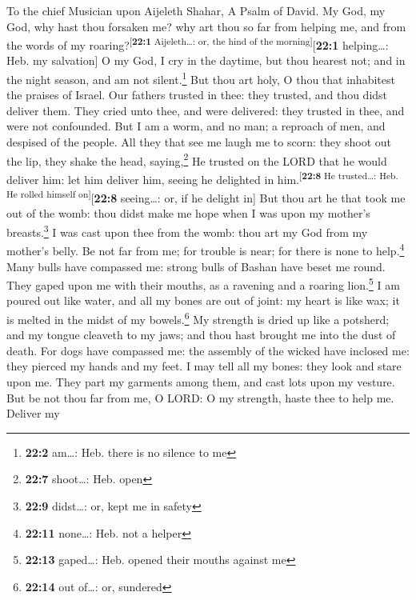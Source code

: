 To the chief Musician upon Aijeleth Shahar, A Psalm of David.
 My God, my God, why hast thou forsaken me? why art thou
so far from helping me, and from the words of my
roaring?\textsuperscript{{[}\textbf{22:1} Aijeleth\ldots: or, the hind
of the morning{]}}{[}\textbf{22:1} helping\ldots: Heb. my salvation{]}
 O my God, I cry in the daytime, but thou hearest not; and
in the night season, and am not silent.\footnote{\textbf{22:2} am\ldots:
  Heb. there is no silence to me}  But thou art holy, O
thou that inhabitest the praises of Israel.  Our fathers
trusted in thee: they trusted, and thou didst deliver them.
 They cried unto thee, and were delivered: they trusted in
thee, and were not confounded.  But I am a worm, and no
man; a reproach of men, and despised of the people.  All
they that see me laugh me to scorn: they shoot out the lip, they shake
the head, saying,\footnote{\textbf{22:7} shoot\ldots: Heb. open}
 He trusted on the LORD that he would deliver him: let him
deliver him, seeing he delighted in
him.\textsuperscript{{[}\textbf{22:8} He trusted\ldots: Heb. He rolled
himself on{]}}{[}\textbf{22:8} seeing\ldots: or, if he delight in{]}
 But thou art he that took me out of the womb: thou didst
make me hope when I was upon my mother's breasts.\footnote{\textbf{22:9}
  didst\ldots: or, kept me in safety}  I was cast upon
thee from the womb: thou art my God from my mother's belly.
 Be not far from me; for trouble is near; for there is
none to help.\footnote{\textbf{22:11} none\ldots: Heb. not a helper}
 Many bulls have compassed me: strong bulls of Bashan
have beset me round.  They gaped upon me with their
mouths, as a ravening and a roaring lion.\footnote{\textbf{22:13}
  gaped\ldots: Heb. opened their mouths against me}  I am
poured out like water, and all my bones are out of joint: my heart is
like wax; it is melted in the midst of my bowels.\footnote{\textbf{22:14}
  out of\ldots: or, sundered}  My strength is dried up
like a potsherd; and my tongue cleaveth to my jaws; and thou hast
brought me into the dust of death.  For dogs have
compassed me: the assembly of the wicked have inclosed me: they pierced
my hands and my feet.  I may tell all my bones: they look
and stare upon me.  They part my garments among them, and
cast lots upon my vesture.  But be not thou far from me,
O LORD: O my strength, haste thee to help me.  Deliver my
